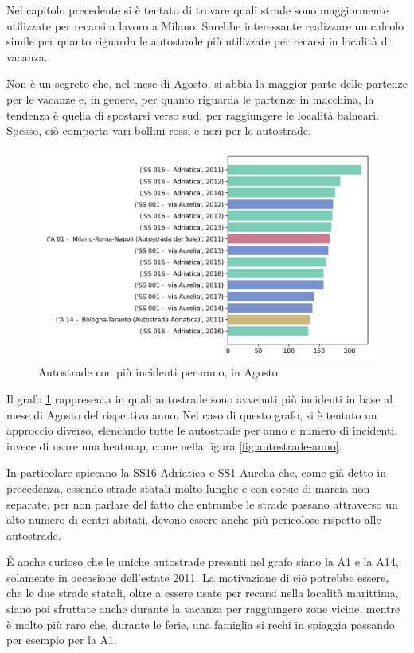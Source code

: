 \documentclass[a4paper,12pt]{report}
\begin{document}
Nel capitolo precedente si è tentato di trovare quali strade sono maggiormente 
utilizzate per recarsi a lavoro a Milano. 
Sarebbe interessante realizzare un calcolo simile per quanto riguarda le autostrade 
più utilizzate per recarsi in località di vacanza. 

Non è un segreto che, nel mese di Agosto, si abbia la maggior parte delle 
partenze per le vacanze e, in genere, per quanto riguarda le 
partenze in macchina, la tendenza è quella di spostarsi verso sud, 
per raggiungere le località balneari.
Spesso, ciò comporta vari bollini rossi e neri per le autostrade. 

\begin{figure}
    \includegraphics[width=\linewidth]{../src/incidenti/incidenti_aci/agosto/autostrade_anno_agosto.png}
    \caption{Autostrade con più incidenti per anno, in Agosto}
    \label{fig:autostrade-anno-agosto}
\end{figure}

Il grafo \ref{fig:autostrade-anno-agosto} rappresenta in quali autostrade sono avvenuti 
più incidenti in base al mese di Agosto del rispettivo anno. 
Nel caso di questo grafo, si è tentato un approccio diverso, elencando 
tutte le autostrade per anno e numero di incidenti, invece di usare una 
heatmap, come nella figura \ref{fig:autostrade-anno}.

In particolare spiccano la SS16 Adriatica e SS1 Aurelia che, come già 
detto in precedenza, essendo strade statali molto lunghe e con corsie di marcia 
non separate, per non parlare del fatto che entrambe le strade passano attraverso un 
alto numero di centri abitati, devono essere anche più pericolose rispetto alle 
autostrade.

\'E anche curioso che le uniche autostrade presenti nel grafo siano la A1 e la A14, 
solamente in occasione dell'estate 2011. 
La motivazione di ciò potrebbe essere, che le due strade statali, oltre a essere usate per 
recarsi nella località marittima, siano poi sfruttate anche durante la vacanza per 
raggiungere zone vicine, mentre è molto più raro che, durante le ferie, una famiglia 
si rechi in spiaggia passando per esempio per la A1.
\end{document}
